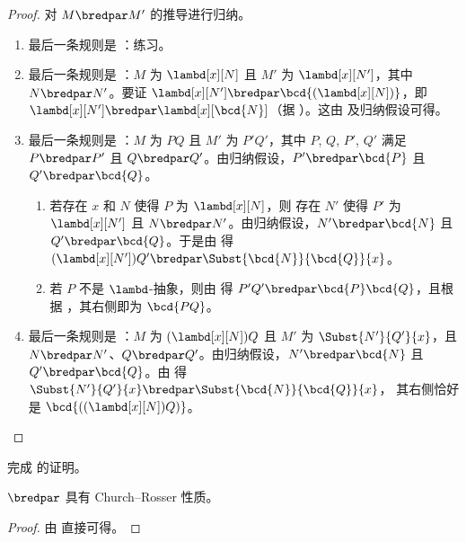 \documentclass[../../../include/open-logic-section]{subfiles}
\begin{document}
\begin{proof}
  对 $M \bredpar M'$ 的推导进行归纳。
  \begin{enumerate}
    \item 最后一条规则是 ：练习。
    \item 最后一条规则是 ：$M$ 为
      $\lambd[x][N]$ 且 $M'$ 为 $\lambd[x][N']$，其中
      $N \bredpar N'$。要证 $\lambd[x][N'] \bredpar
      \bcd{(\lambd[x][N])}$，即 $\lambd[x][N'] \bredpar
      \lambd[x][\bcd{N}]$（据 ）。这由
       及归纳假设可得。
    \item 最后一条规则是 ：$M$ 为 $PQ$ 且 $M'$
      为 $P'Q'$，其中 $P$, $Q$, $P'$, $Q'$ 满足 $P \bredpar P'$
      且 $Q \bredpar Q'$。由归纳假设，$P'
      \bredpar \bcd{P}$ 且 $Q' \bredpar \bcd{Q}$。
      \begin{enumerate}
        \item 若存在 $x$ 和 $N$ 使得 $P$ 为 $\lambd[x][N]$，则
          存在 $N'$ 使得 $P'$ 为 $\lambd[x][N']$ 且 $N \bredpar N'$。由归纳假设，$N' \bredpar \bcd{N}$ 且
          $Q' \bredpar \bcd{Q}$。于是由  得 $(\lambd[x][N'])Q' \bredpar
          \Subst{\bcd{N}}{\bcd{Q}}{x}$。
        \item 若 $P$ 不是 $\lambd$-抽象，则由  得 $P'Q' \bredpar
          \bcd{P}\bcd{Q}$，且根据 ，其右侧即为 $\bcd{PQ}$。
      \end{enumerate}
    \item 最后一条规则是 ：$M$ 为
      $(\lambd[x][N])Q$ 且 $M'$ 为 $\Subst{N'}{Q'}{x}$，且 $N \bredpar N'$、$Q \bredpar
      Q'$。由归纳假设，$N' \bredpar \bcd{N}$ 且
      $Q' \bredpar \bcd{Q}$。由  得
      $\Subst{N'}{Q'}{x} \bredpar \Subst{\bcd{N}}{\bcd{Q}}{x}$，
      其右侧恰好是 $\bcd{((\lambd[x][N])Q)}$。
  \end{enumerate}
\end{proof}

\begin{prob}
  完成  的证明。
\end{prob}

\begin{thm}
  $\bredpar$ 具有 Church--Rosser 性质。
\end{thm}

\begin{proof}
  由  直接可得。
\end{proof}
\end{document}
